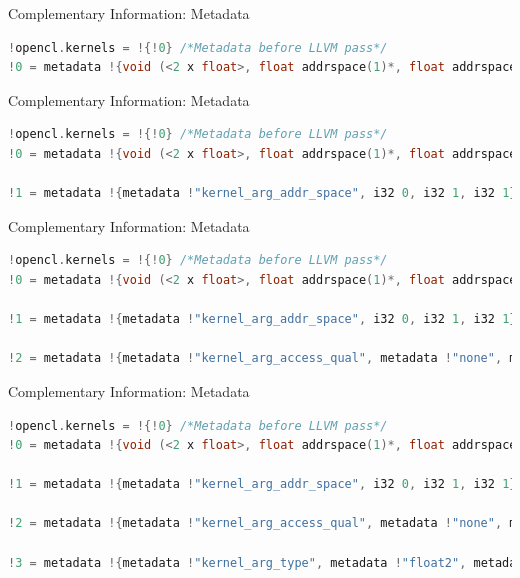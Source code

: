\documentclass{beamer}
\begin{document}
\begin{frame}[fragile]{Complementary Information: Metadata}
  \begin{lstlisting}[language=C]
!opencl.kernels = !{!0} /*Metadata before LLVM pass*/
!0 = metadata !{void (<2 x float>, float addrspace(1)*, float addrspace(1)*)* @addition, metadata !1, metadata !2, metadata !3, metadata !4, metadata !5}

  \end{lstlisting}
\end{frame}
\begin{frame}[fragile]{Complementary Information: Metadata}
  \begin{lstlisting}[language=C]
!opencl.kernels = !{!0} /*Metadata before LLVM pass*/
!0 = metadata !{void (<2 x float>, float addrspace(1)*, float addrspace(1)*)* @addition, metadata !1, metadata !2, metadata !3, metadata !4, metadata !5}

!1 = metadata !{metadata !"kernel_arg_addr_space", i32 0, i32 1, i32 1}
  \end{lstlisting}
\end{frame}
\begin{frame}[fragile]{Complementary Information: Metadata}
  \begin{lstlisting}[language=C]
!opencl.kernels = !{!0} /*Metadata before LLVM pass*/
!0 = metadata !{void (<2 x float>, float addrspace(1)*, float addrspace(1)*)* @addition, metadata !1, metadata !2, metadata !3, metadata !4, metadata !5}

!1 = metadata !{metadata !"kernel_arg_addr_space", i32 0, i32 1, i32 1}

!2 = metadata !{metadata !"kernel_arg_access_qual", metadata !"none", metadata !"none", metadata !"none"}
  \end{lstlisting}
\end{frame}
\begin{frame}[fragile]{Complementary Information: Metadata}
  \begin{lstlisting}[language=C]
!opencl.kernels = !{!0} /*Metadata before LLVM pass*/
!0 = metadata !{void (<2 x float>, float addrspace(1)*, float addrspace(1)*)* @addition, metadata !1, metadata !2, metadata !3, metadata !4, metadata !5}

!1 = metadata !{metadata !"kernel_arg_addr_space", i32 0, i32 1, i32 1}

!2 = metadata !{metadata !"kernel_arg_access_qual", metadata !"none", metadata !"none", metadata !"none"}

!3 = metadata !{metadata !"kernel_arg_type", metadata !"float2", metadata !"float*", metadata !"float*"}
  \end{lstlisting}
\end{frame}
\end{document}
